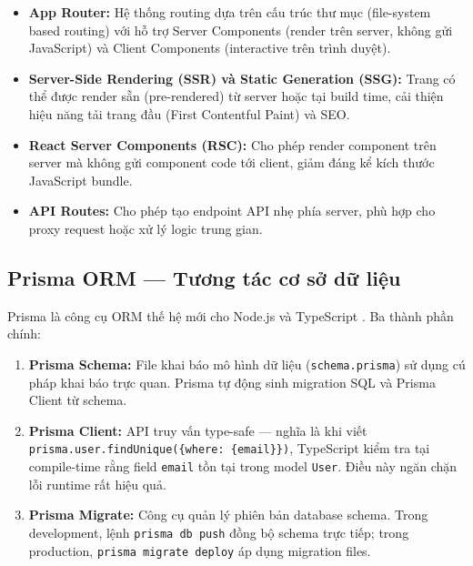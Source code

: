 \begin{itemize}
    \item \textbf{App Router:} Hệ thống routing dựa trên cấu trúc thư mục (file-system based routing) với hỗ trợ Server Components (render trên server, không gửi JavaScript) và Client Components (interactive trên trình duyệt).

    \item \textbf{Server-Side Rendering (SSR) và Static Generation (SSG):} Trang có thể được render sẵn (pre-rendered) từ server hoặc tại build time, cải thiện hiệu năng tải trang đầu (First Contentful Paint) và SEO.

    \item \textbf{React Server Components (RSC):} Cho phép render component trên server mà không gửi component code tới client, giảm đáng kể kích thước JavaScript bundle.

    \item \textbf{API Routes:} Cho phép tạo endpoint API nhẹ phía server, phù hợp cho proxy request hoặc xử lý logic trung gian.
\end{itemize}

\subsection{Prisma ORM --- Tương tác cơ sở dữ liệu}

Prisma là công cụ ORM thế hệ mới cho Node.js và TypeScript \cite{prisma2023docs}. Ba thành phần chính:

\begin{enumerate}
    \item \textbf{Prisma Schema:} File khai báo mô hình dữ liệu (\texttt{schema.prisma}) sử dụng cú pháp khai báo trực quan. Prisma tự động sinh migration SQL và Prisma Client từ schema.

    \item \textbf{Prisma Client:} API truy vấn type-safe --- nghĩa là khi viết \texttt{prisma.user.findUnique(\{where: \{email\}\})}, TypeScript kiểm tra tại compile-time rằng field \texttt{email} tồn tại trong model \texttt{User}. Điều này ngăn chặn lỗi runtime rất hiệu quả.

    \item \textbf{Prisma Migrate:} Công cụ quản lý phiên bản database schema. Trong development, lệnh \texttt{prisma db push} đồng bộ schema trực tiếp; trong production, \texttt{prisma migrate deploy} áp dụng migration files.
\end{enumerate}

